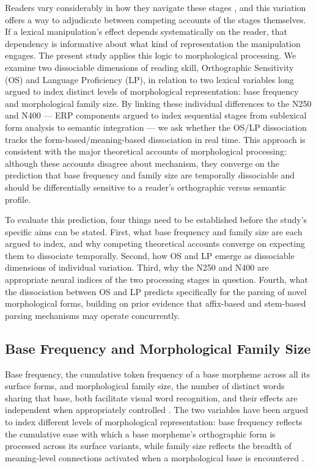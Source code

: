 \documentclass[utf8]{FrontiersinHarvard} %
\begin{document}
	Readers vary considerably in how they navigate these stages \citep{perfettiReadingAbilityLexical2007, castlesHowDoesOrthographic2006, stanovichExposurePrintOrthographic1989}, and this variation offers a way to adjudicate between competing accounts of the stages themselves. If a lexical manipulation's effect depends systematically on the reader, that dependency is informative about what kind of representation the manipulation engages. The present study applies this logic to morphological processing. We examine two dissociable dimensions of reading skill, Orthographic Sensitivity (OS) and Language Proficiency (LP), in relation to two lexical variables long argued to index distinct levels of morphological representation: base frequency and morphological family size. By linking these individual differences to the N250 and N400 --- ERP components argued to index sequential stages from sublexical form analysis to semantic integration --- we ask whether the OS/LP dissociation tracks the form-based/meaning-based dissociation in real time. This approach is consistent with the major theoretical accounts of morphological processing: although these accounts disagree about mechanism, they converge on the prediction that base frequency and family size are temporally dissociable and should be differentially sensitive to a reader's orthographic versus semantic profile.

	To evaluate this prediction, four things need to be established before the study's specific aims can be stated. First, what base frequency and family size are each argued to index, and why competing theoretical accounts converge on expecting them to dissociate temporally. Second, how OS and LP emerge as dissociable dimensions of individual variation. Third, why the N250 and N400 are appropriate neural indices of the two processing stages in question. Fourth, what the dissociation between OS and LP predicts specifically for the parsing of novel morphological forms, building on prior evidence that affix-based and stem-based parsing mechanisms may operate concurrently.

	\subsection{Base Frequency and Morphological Family Size}

	Base frequency, the cumulative token frequency of a base morpheme across all its surface forms, and morphological family size, the number of distinct words sharing that base, both facilitate visual word recognition, and their effects are independent when appropriately controlled \citep{fordDerivationalMorphologyBase2010}. The two variables have been argued to index different levels of morphological representation: base frequency reflects the cumulative ease with which a base morpheme's orthographic form is processed across its surface variants, while family size reflects the breadth of meaning-level connections activated when a morphological base is encountered \citep{schreuderHowComplexSimplex1997, taftMorphologicalDecompositionReverse2004, taftRecognitionAffixedWords1979, dejongMorphologicalFamilySize2000, bertramEffectsFamilySize2000}.
\end{document}
